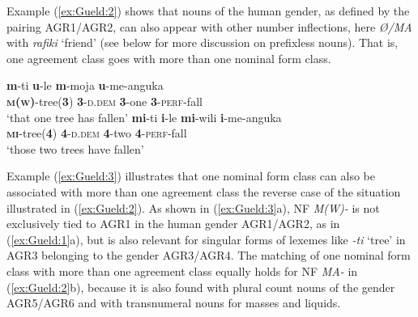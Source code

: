 \documentclass[output=collectionpaper]{langsci/langscibook}
\begin{document}
%

Example (\ref{ex:Gueld:2}) shows that  nouns of the human gender, as defined by the pairing AGR1/AGR2, can also appear with other number inflections, here \textit{Ø/MA} with \textit{rafiki} `friend' (see below for more discussion on prefixless nouns). That is, one agreement class goes with more than one nominal form class.

\ea%
    \label{ex:Gueld:3}
\begin{xlist}
\ex
\gll \textbf{m}{}-ti  \textbf{u}{}-le  \textbf{m}{}-moja  \textbf{u}{}-me-anguka\\
     \textbf{\textsc{m(w)}}{}-tree(\textbf{3})  \textbf{3}{}-\textsc{d.dem}  \textbf{3}{}-one  \textbf{3}{}-\textsc{perf}{}-fall\\
\glt `that one tree has fallen'
\ex
\gll \textbf{mi}{}-ti  \textbf{i}{}-le  \textbf{mi}{}-wili  \textbf{i}{}-me-anguka\\
     \textbf{\textsc{mi}}{}-tree(\textbf{4})  \textbf{4}{}-\textsc{d.dem}  \textbf{4}{}-two  \textbf{4}{}-\textsc{perf}{}-fall\\
\glt `those two trees have fallen'
\end{xlist}
\z

Example (\ref{ex:Gueld:3}) illustrates that one nominal form class can also be associated with more than one agreement class \textendash{} the reverse case of the situation illustrated in (\ref{ex:Gueld:2}). As shown in (\ref{ex:Gueld:3}a), NF \textit{M(W)-} is not exclusively tied to AGR1 in the human gender AGR1/AGR2, as in (\ref{ex:Gueld:1}a), but is also relevant for singular forms of lexemes like \textit{{}-ti} `tree' in AGR3 belonging to the gender AGR3/AGR4. The matching of one nominal form class with more than one agreement class equally holds for NF \textit{MA-} in (\ref{ex:Gueld:2}b), because it is also found with plural count nouns of the gender AGR5/AGR6 and with transnumeral nouns for masses and liquids.
\end{document}
